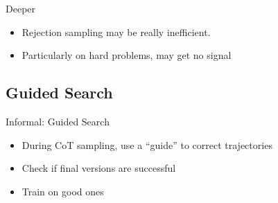 \documentclass[14pt,aspectratio=169]{beamer}
\begin{document}
\begin{frame}{Deeper}
	\begin{itemize}
		\item Rejection sampling may be really inefficient.
		\item Particularly on hard problems, may get no signal
	\end{itemize}
\end{frame}

\subsection{Guided Search}

\begin{frame}{Informal: Guided Search}
	\begin{itemize}
		\item During CoT sampling, use a ``guide'' to
		      correct trajectories
		\item Check if final versions are successful
		\item Train on good ones
	\end{itemize}
\end{frame}
\end{document}
